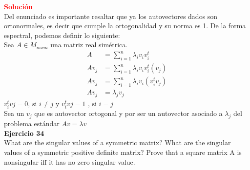 \documentclass[12pt]{article}
\begin{document}
\noindent \textcolor{red}{\bf Solución}\\
Del enunciado es importante resaltar que ya los autovectores dados son ortonormales, es decir que cumple la ortogonalidad y su norma es 1.
De la forma espectral, podemos definir lo siguiente:\\
Sea $A \in M_{mxm}$ una matriz real simétrica.\\
\begin{align*}
    A &=\sum_{i=1}^{n}\lambda_i v_iv_i^t\\
    Av_j &=\sum_{i=1}^{n}\lambda_i v_iv_i^t(v_j)\\
    Av_j &=\sum_{i=1}^{n}\lambda_i v_i(v_i^t v_j)\\
    Av_j &=\lambda_j v_j
\end{align*}
    $v_i^tvj=0 \textrm{, si } i \not=j  \textrm{ y } v_i^tvj=1 \textrm{ , si } i=j$\\
Sea un $v_j$ que es autovector ortogonal y por ser un  autovector asociado a $\lambda_j$ del problema estándar $Av=\lambda v$\\

\noindent \textbf{Ejercicio 34}\\
What are the singular values of a symmetric matrix? What are the singular values of a symmetric positive definite matrix? Prove that a square matrix A is nonsingular iff it has no zero singular value.\\
\end{document}
